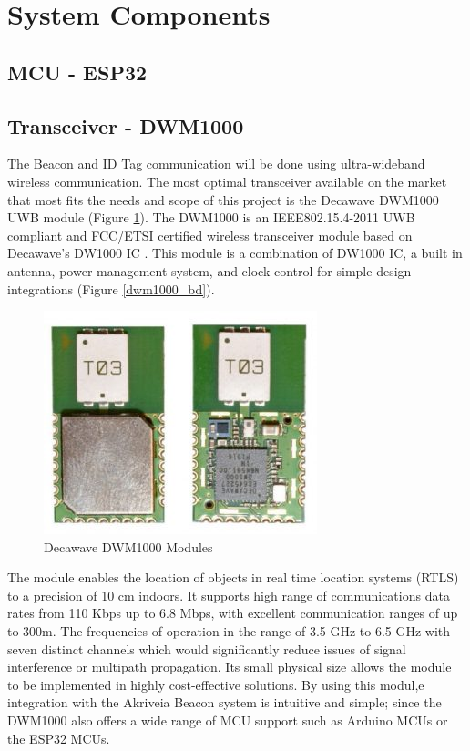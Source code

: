 

\setcounter{section}{2}
\section{System Components}
\bigskip

\subsection{MCU - ESP32}


\pagebreak
\subsection{Transceiver - DWM1000} 
\medskip
The Beacon and ID Tag communication will be done using ultra-wideband wireless communication. The most optimal transceiver available on the market that most fits the needs and scope of this project is the Decawave DWM1000 UWB module (Figure \ref{dwm1000}). The DWM1000 is an IEEE802.15.4-2011 UWB compliant and FCC/ETSI certified wireless transceiver module based on Decawave’s DW1000 IC \cite{R4-2-1}. This module is a combination of DW1000 IC, a built in antenna, power management system, and clock control for simple design integrations (Figure \ref{dwm1000_bd}). 

\medskip
\begin{figure}[H]
\centering
    \includegraphics[scale=0.65]{./images/dwm1000.jpg}
    \caption{Decawave DWM1000 Modules}
    \label{dwm1000}
\end{figure}

The module enables the location of objects in real time location systems (RTLS) to a precision of 10 cm indoors. It supports high range of communications data rates from 110 Kbps up to 6.8 Mbps, with excellent communication ranges of up to 300m. The frequencies of operation in the range of 3.5 GHz to 6.5 GHz with seven distinct channels which would significantly reduce issues of signal interference or multipath propagation. Its small physical size allows the module to be implemented in highly cost-effective solutions. By using this modul,e integration with the Akriveia Beacon system is intuitive and simple; since the DWM1000 also offers a wide range of MCU support such as Arduino MCUs or the ESP32 MCUs. 

